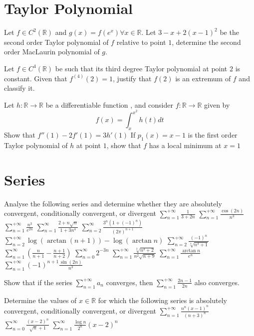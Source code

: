 \documentclass[12pt]{article}
\begin{document}
\section{Taylor Polynomial}
\begin{ExerciseList}
	\Exercise Let $f\in C^2(\mathbb R)$ and $g(x)=f(e^x)\forall x\in\mathbb R$.
	Let $3-x+2(x-1)^2$ be the second order Taylor polynomial of $f$ relative
	to point $1$, determine the second order MacLaurin polynomial of $g$.

	\Exercise Let $f\in C^4(\mathbb R)$ be such that its third degree Taylor
	polynomial at point $2$ is constant. Given that $f^{(4)}(2)=1$, justify that
	$f(2)$ is an extremum of $f$ and classify it.

	\Exercise Let $h\colon \mathbb R \to \mathbb R$ be a differentiable function
	, and consider $f\colon \mathbb R\to\mathbb R$ given by
	$$f(x)=\int_x^{x^2}{h(t)}dt$$
	\Question Show that $f''(1)-2f'(1)=3h'(1)$
	\Question If $p_1(x)=x-1$ is the first order Taylor polynomial of $h$ at point $1$,
	show that $f$ has a local minimum at $x=1$
\end{ExerciseList}

\section{Series}
\begin{ExerciseList}
	\Exercise Analyse the following series and determine whether they are absolutely convergent, conditionally convergent, or divergent
	\Question $\sum_{n=1}^{+\infty} \frac{1}{3+2n}$
	\Question $\sum_{n=1}^{+\infty} \frac{\cos(2n)}{n^3}$
	\Question $\sum_{n=1}^{+\infty} \frac{n^3}{e^{2n}}$
	\Question $\sum_{n=1}^{\infty}  \frac{2+n\sqrt{n}}{1+3n^4}$
	\Question $\sum_{n=2}^{\infty}  \frac{3^n(1+(-1)^n)}{(2\pi)^{n+1}}$
	\Question $\sum_{n=2}^{+\infty} \log(\arctan(n+1))-\log(\arctan n)$
	\Question $\sum_{n=2}^{+\infty} \frac{(-1)^n}{\sqrt[4]{n^3 + 1}}$
	\Question $\sum_{n=1}^{\infty}  (\frac{n}{n+1} - \frac{n+1}{n+2})$
	\Question $\sum_{n=0}^{\infty}  2^{-3n}$
	\Question $\sum_{n=1}^{+\infty}\frac{\sqrt[3]{n^3+2}}{n^2\sqrt{n+9}}$
	\Question $\sum_{n=1}^{+\infty}\frac{\arctan{n}}{e^n}$
	\Question $\sum_{n=1}^{+\infty}(-1)^{n+1}\frac{\sin(2n)}{n^3}$

	\Exercise Show that if the series $\sum_{n=1}^{+\infty}a_n$ converges, then
	$\sum_{n=1}^{+\infty}\frac{2n-1}{2n}$ also converges.

	\Exercise Determine the values of $x\in\mathbb R$ for which the following series
	is absolutely convergent, conditionally convergent, or divergent
	\Question $\sum_{n=1}^{+\infty}\frac{n^n(x-1)^n}{(n+3)^n}$
	\Question $\sum_{n=0}^{\infty}\frac{(x-2)^n}{\sqrt{n}+1}$
	\Question $\sum_{n=1}^{\infty}\frac{\log n}{2^n}(x-2)^n$
\end{ExerciseList}
\end{document}
